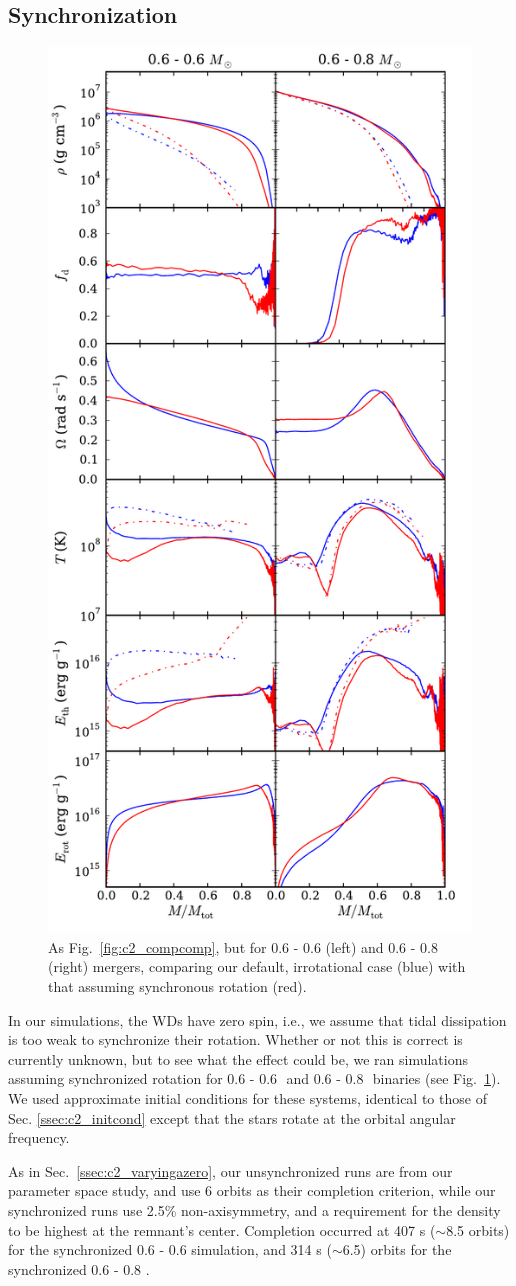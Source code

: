 \subsection{Synchronization}
\label{ssec:c2_synchronization}

\begin{figure}
\centering
\includegraphics[angle=0,width=0.5\columnwidth]{chapter2_zhu+13/figures/synchcomp.pdf}
\caption{As Fig.~\ref{fig:c2_compcomp}, but for 0.6 - 0.6 {\Msun} (left) and 0.6 - 0.8 {\Msun} (right) mergers, comparing our default, irrotational case (blue) with that assuming synchronous rotation (red).}
\label{fig:c2_synchcomp}
\end{figure}

In our simulations, the WDs have zero spin, i.e., we assume that tidal dissipation is too weak to synchronize their rotation.  Whether or not this is correct is currently unknown, but to see what the effect could be, we ran simulations assuming synchronized rotation for 0.6 - 0.6\,\Msun\ and 0.6 - 0.8\,\Msun\ binaries (see Fig.~\ref{fig:c2_synchcomp}).  We used approximate initial conditions for these systems, identical to those of Sec. \ref{ssec:c2_initcond} except that the stars rotate at the orbital angular frequency.

As in Sec.~\ref{ssec:c2_varyingazero}, our unsynchronized runs are from our parameter space study, and use 6 orbits as their completion criterion, while our synchronized runs use 2.5\% non-axisymmetry, and a requirement for the density to be highest at the remnant's center.  Completion occurred at 407 s ($\sim$8.5 orbits) for the synchronized 0.6 - 0.6 {\Msun} simulation, and 314 s ($\sim$6.5) orbits for the synchronized 0.6 - 0.8 {\Msun}.

